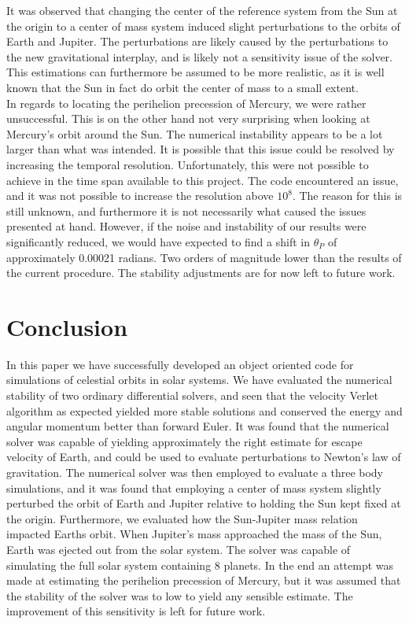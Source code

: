 \documentclass[%
reprint,nofootinbib,
amsmath,amssymb,
aps,
]{revtex4-1}
\begin{document}
It was observed that changing the center of the reference system from the Sun at the origin to a center of mass system induced slight perturbations to the orbits of Earth and Jupiter. The perturbations are likely caused by the perturbations to the new gravitational interplay, and is likely not a sensitivity issue of the solver. This estimations can furthermore be assumed to be more realistic, as it is well known that the Sun in fact do orbit the center of mass to a small extent. \\ \indent 
In regards to locating the perihelion precession of Mercury, we were rather unsuccessful. This is on the other hand not very surprising when looking at Mercury's orbit around the Sun. The numerical instability appears to be a lot larger than what was intended. It is possible that this issue could be resolved by increasing the temporal resolution. Unfortunately, this were not possible to achieve in the time span available to this project. The code encountered an issue, and it was not possible to increase the resolution above $10^{8}$. The reason for this is still unknown, and furthermore it is not necessarily what caused the issues presented at hand. However, if the noise and instability of our results were significantly reduced, we would have expected to find a shift in $\theta_P$ of approximately 0.00021 radians. Two orders of magnitude lower than the results of the current procedure. The stability adjustments are for now left to future work. 


\section{Conclusion} \noindent 
In this paper we have successfully developed an object oriented code for simulations of celestial orbits in solar systems. We have evaluated the numerical stability of two ordinary differential solvers, and seen that the velocity Verlet algorithm as expected yielded more stable solutions and conserved the energy and angular momentum better than forward Euler. It was found that the numerical solver was capable of yielding approximately the right estimate for escape velocity of Earth, and could be used to evaluate perturbations to Newton's law of gravitation. The numerical solver was then employed to evaluate a three body simulations, and it was found that employing a center of mass system slightly perturbed the orbit of Earth and Jupiter relative to holding the Sun kept fixed at the origin. Furthermore, we evaluated how the Sun-Jupiter mass relation impacted Earths orbit. When Jupiter's mass approached the mass of the Sun, Earth was ejected out from the solar system. The solver was capable of simulating the full solar system containing 8 planets. In the end an attempt was made at estimating the perihelion precession of Mercury, but it was assumed that the stability of the solver was to low to yield any sensible estimate. The improvement of this sensitivity is left for future work. 
\end{document}
